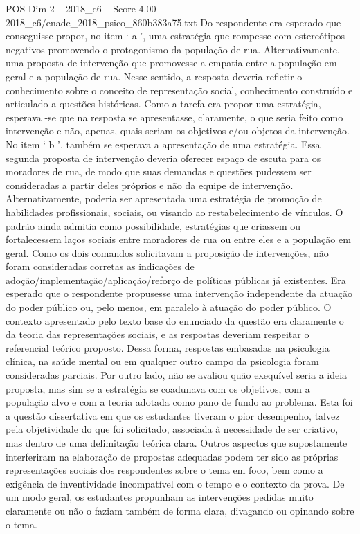 \begin{textsample}{POS Dim 2 – 2018\_c6 – Score 4.00 – 2018\_c6/enade\_2018\_psico\_860b383a75.txt}
Do respondente era esperado que conseguisse propor, no item ‘ a ’, uma estratégia que rompesse com estereótipos negativos promovendo o protagonismo da população de rua.
Alternativamente, uma proposta de intervenção que promovesse a empatia entre a população em geral e a população de rua.
Nesse sentido, a resposta deveria refletir o conhecimento sobre o conceito de representação social, conhecimento construído e articulado a questões históricas.
Como a tarefa era propor uma estratégia, esperava -se que na resposta se apresentasse, claramente, o que seria feito como intervenção e não, apenas, quais seriam os objetivos e/ou objetos da intervenção.
No item ‘ b ’, também se esperava a apresentação de uma estratégia.
Essa segunda proposta de intervenção deveria oferecer espaço de escuta para os moradores de rua, de modo que suas demandas e questões pudessem ser consideradas a partir deles próprios e não da equipe de intervenção.
Alternativamente, poderia ser apresentada uma estratégia de promoção de habilidades profissionais, sociais, ou visando ao restabelecimento de vínculos.
O padrão ainda admitia como possibilidade, estratégias que criassem ou fortalecessem laços sociais entre moradores de rua ou entre eles e a população em geral.
Como os dois comandos solicitavam a proposição de intervenções, não foram consideradas corretas as indicações de adoção/implementação/aplicação/reforço de políticas públicas já existentes.
Era esperado que o respondente propusesse uma intervenção independente da atuação do poder público ou, pelo menos, em paralelo à atuação do poder público.
O contexto apresentado pelo texto base do enunciado da questão era claramente o da teoria das representações sociais, e as respostas deveriam respeitar o referencial teórico proposto.
Dessa forma, respostas embasadas na psicologia clínica, na saúde mental ou em qualquer outro campo da psicologia foram consideradas parciais.
Por outro lado, não se avaliou quão exequível seria a ideia proposta, mas sim se a estratégia se coadunava com os objetivos, com a população alvo e com a teoria adotada como pano de fundo ao problema.
Esta foi a questão dissertativa em que os estudantes tiveram o pior desempenho, talvez pela objetividade do que foi solicitado, associada à necessidade de ser criativo, mas dentro de uma delimitação teórica clara.
Outros aspectos que supostamente interferiram na elaboração de propostas adequadas podem ter sido as próprias representações sociais dos respondentes sobre o tema em foco, bem como a exigência de inventividade incompatível com o tempo e o contexto da prova.
De um modo geral, os estudantes propunham as intervenções pedidas muito claramente ou não o faziam também de forma clara, divagando ou opinando sobre o tema.

\end{textsample}
